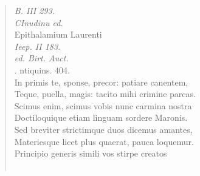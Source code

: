 \documentclass[11pt, a4paper]{report}
\begin{document}
      \begin{verse}
      \textit{B. III 293.} \\ \textit{CInudinu ed.} \\ Epithalamium Laurenti \\ \textit{Ieep. II 183.} \\ \textit{ed. Birt. Auct.} \\ . ntiquins. 404. \\ In primis te, sponse, precor: patiare canentem, \\ Teque, puella, magis: tacito mihi crimine parcas. \\ Scimus enim, scimus vobis nunc carmina nostra \\ Doctiloquique etiam linguam sordere Maronis. \\ Sed breviter strictimque duos dicemus amantes, \\ Materiesque licet plus quaerat, pauca loquemur. \\ Principio generis simili vos stirpe creatos \\ 
        ﻿\pagebreak 

\end{verse}
\end{document}
